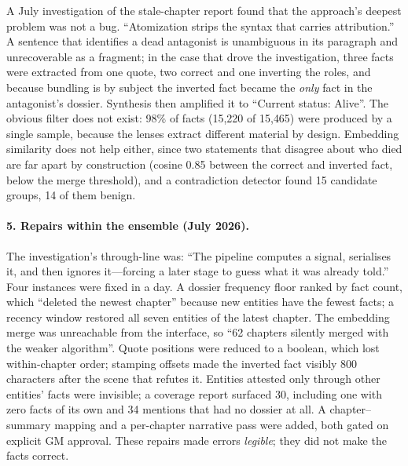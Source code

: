 \documentclass[11pt]{article}
\begin{document}
A July investigation of the stale-chapter report found that the approach's deepest problem was not a
bug. ``Atomization strips the syntax that carries attribution.'' A sentence that identifies a dead
antagonist is unambiguous in its paragraph and unrecoverable as a fragment; in the case that drove the
investigation, three facts were extracted from one quote, two correct and one inverting the roles,
and because bundling is by subject the inverted fact became the \emph{only} fact in the antagonist's
dossier. Synthesis then amplified it to ``Current status: Alive''. The obvious filter does not exist:
98\% of facts (15{,}220 of 15{,}465) were produced by a single sample, because the lenses extract
different material by design. Embedding similarity does not help either, since two statements that
disagree about who died are far apart by construction (cosine 0.85 between the correct and inverted
fact, below the merge threshold), and a contradiction detector found 15 candidate groups, 14 of
them benign.

\paragraph{5. Repairs within the ensemble (July 2026).}
The investigation's through-line was: ``The pipeline computes a signal, serialises it, and then
ignores it---forcing a later stage to guess what it was already told.'' Four instances were fixed in a
day. A dossier frequency floor ranked by fact count, which ``deleted the newest chapter'' because
new entities have the fewest facts; a recency window restored all seven entities of the latest chapter.
The embedding merge was unreachable from the interface, so ``62 chapters silently merged with the
weaker algorithm''. Quote positions were reduced to a boolean, which lost within-chapter order;
stamping offsets made the inverted fact visibly 800 characters after the scene that refutes it.
Entities attested only through other entities' facts were invisible; a coverage report surfaced 30,
including one with zero facts of its own and 34 mentions that had no dossier at all. A chapter--summary
mapping and a per-chapter narrative pass were added, both gated on explicit GM approval. These repairs
made errors \emph{legible}; they did not make the facts correct.
\end{document}
